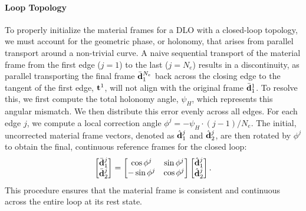 \paragraph{Loop Topology}
To properly initialize the material frames for a DLO with a closed-loop topology, we must account for the geometric phase, or holonomy, that arises from parallel transport around a non-trivial curve. A naive sequential transport of the material frame from the first edge ($j=1$) to the last ($j=N_e$) results in a discontinuity, as parallel transporting the final frame $\bar{{\mathbf{d}}}_1^{N_e}$ back across the closing edge to the tangent of the first edge, ${\mathbf{t}}^1$, will not align with the original frame $\bar{{\mathbf{d}}}_1^1$. To resolve this, we first compute the total holonomy angle, $\psi_H$, which represents this angular mismatch. We then distribute this error evenly across all edges. For each edge $j$, we compute a local correction angle $\phi^j = - \psi_H \cdot (j-1) / N_e$. The initial, uncorrected material frame vectors, denoted as $\hat{{\mathbf{d}}}_1^j$ and $\hat{{\mathbf{d}}}_2^j$, are then rotated by $\phi^j$ to obtain the final, continuous reference frames for the closed loop:
\begin{equation} \begin{bmatrix} \bar{{\mathbf{d}}}_1^j \\ \bar{{\mathbf{d}}}_2^j \end{bmatrix} = \begin{bmatrix} \cos \phi^j & \sin \phi^j \\ -\sin \phi^j & \cos \phi^j \end{bmatrix} \begin{bmatrix} \hat{{\mathbf{d}}}_1^j \\ \hat{{\mathbf{d}}}_2^j \end{bmatrix}.
\end{equation}
This procedure ensures that the material frame is consistent and continuous across the entire loop at its rest state.


